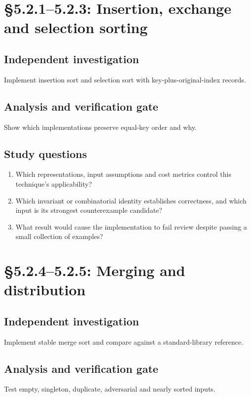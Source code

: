 \documentclass[11pt,letterpaper]{article}
\begin{document}
\section{\S 5.2.1--5.2.3: Insertion, exchange and selection sorting}
\subsection{Independent investigation}
Implement insertion sort and selection sort with key-plus-original-index records.
\subsection{Analysis and verification gate}
Show which implementations preserve equal-key order and why.
\subsection{Study questions}
\begin{enumerate}
\item Which representations, input assumptions and cost metrics control this technique's applicability?
\item Which invariant or combinatorial identity establishes correctness, and which input is its strongest counterexample candidate?
\item What result would cause the implementation to fail review despite passing a small collection of examples?
\end{enumerate}

\section{\S 5.2.4--5.2.5: Merging and distribution}
\subsection{Independent investigation}
Implement stable merge sort and compare against a standard-library reference.
\subsection{Analysis and verification gate}
Test empty, singleton, duplicate, adversarial and nearly sorted inputs.
\end{document}
